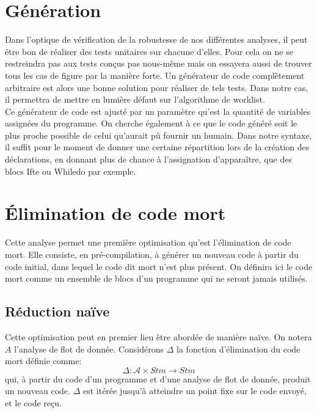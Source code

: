 \documentclass[a4paper, 12pt]{article}
\begin{document}
\section{Génération}
Dans l'optique de vérification de la robustesse de nos différentes analyses, il peut être bon de réaliser
des tests unitaires sur chacune d'elles. Pour cela on ne se restreindra pas aux tests conçus pas nous-même
mais on essayera aussi de trouver tous les cas de figure par la manière forte. Un générateur de code complètement
arbitraire est alors une bonne solution pour réaliser de tels tests. Dans notre cas, il permettra de mettre en
lumière défaut sur l'algorithme de worklist.
\\
Ce générateur de code est ajusté par un paramètre qu'est la quantité de variables assignées du programme. On
cherche également à ce que le code généré soit le plus proche possible de celui qu'aurait pû fournir un humain.
Dans notre syntaxe, il suffit pour le moment de donner une certaine répartition lors de la création des déclarations,
en donnant plus de chance à l'assignation d'apparaître, que des blocs Ifte ou Whiledo par exemple.

\section{Élimination de code mort}
Cette analyse permet une première optimisation qu'est l'élimination de code mort. Elle consiste, en pré-compilation,
à générer un nouveau code à partir du code initial, dans lequel le code dit mort n'est plus présent.
On définira ici le code mort comme un ensemble de blocs d'un programme qui ne seront jamais utilisés.

\subsection{Réduction naïve}
Cette optimisation peut en premier lieu être abordée de manière naïve. On notera $A$ l'analyse de flot de donnée.
Considérons $\Delta$ la fonction d'élimination du code mort définie comme:
\[\Delta : \mathcal{A} \times Stm \longrightarrow Stm\]
qui, à partir du code d'un programme et d'une analyse de flot de donnée, produit un nouveau code. $\Delta$ est itérée
jusqu'à atteindre un point fixe sur le code envoyé, et le code reçu.	
\end{document}
